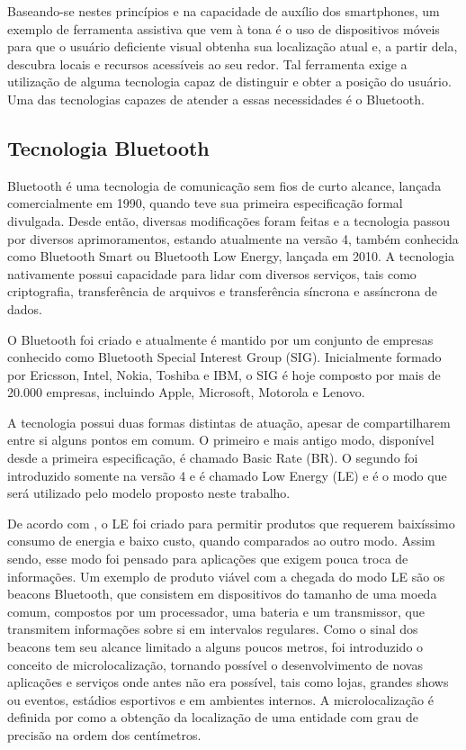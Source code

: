 \documentclass[twoside,english,brazilian]{UNISINOSartigo}
\begin{document}
Baseando-se nestes princípios e na capacidade de auxílio dos smartphones, um exemplo de ferramenta assistiva que vem à tona é o uso de dispositivos móveis para que o usuário deficiente visual obtenha sua localização atual e, a partir dela, descubra locais e recursos acessíveis ao seu redor. Tal ferramenta exige a utilização de alguma tecnologia capaz de distinguir e obter a posição do usuário. Uma das tecnologias capazes de atender a essas necessidades é o Bluetooth.

\subsection{Tecnologia Bluetooth}
Bluetooth é uma tecnologia de comunicação sem fios de curto alcance, lançada comercialmente em 1990, quando teve sua primeira especificação formal divulgada. Desde então, diversas modificações foram feitas e a tecnologia passou por diversos aprimoramentos, estando atualmente na versão 4, também conhecida como Bluetooth Smart ou Bluetooth Low Energy, lançada em 2010. A tecnologia nativamente possui capacidade para lidar com diversos serviços, tais como criptografia, transferência de arquivos e transferência síncrona e assíncrona de dados.

O Bluetooth foi criado e atualmente é mantido por um conjunto de empresas conhecido como Bluetooth Special Interest Group (SIG). Inicialmente formado por Ericsson, Intel, Nokia, Toshiba e IBM, o SIG é hoje composto por mais de 20.000 empresas, incluindo Apple, Microsoft, Motorola e Lenovo.

A tecnologia possui duas formas distintas de atuação, apesar de compartilharem entre si alguns pontos em comum. O primeiro e mais antigo modo, disponível desde a primeira especificação, é chamado Basic Rate (BR). O segundo foi introduzido somente na versão 4 e é chamado Low Energy (LE) e é o modo que será utilizado pelo modelo proposto neste trabalho.

De acordo com , o LE foi criado para permitir produtos que requerem baixíssimo consumo de energia e baixo custo, quando comparados ao outro modo. Assim sendo, esse modo foi pensado para aplicações que exigem pouca troca de informações. Um exemplo de produto viável com a chegada do modo LE são os beacons Bluetooth, que consistem em dispositivos do tamanho de uma moeda comum, compostos por um processador, uma bateria e um transmissor, que transmitem informações sobre si em intervalos regulares. Como o sinal dos beacons tem seu alcance limitado a alguns poucos metros, foi introduzido o conceito de microlocalização, tornando possível o desenvolvimento de novas aplicações e serviços onde antes não era possível, tais como lojas, grandes shows ou eventos, estádios esportivos e em ambientes internos. A microlocalização é definida por  como a obtenção da localização de uma entidade com grau de precisão na ordem dos centímetros. 
\end{document}
